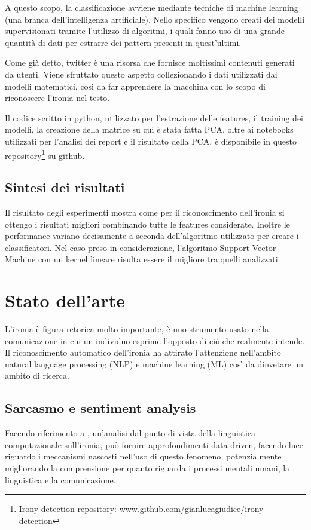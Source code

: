 \documentclass[oneside]{book}
\begin{document}
A questo scopo, la classificazione avviene mediante tecniche di machine learning (una branca dell'intelligenza artificiale). Nello specifico vengono creati dei modelli supervisionati tramite l'utilizzo di algoritmi, i quali fanno uso di una grande quantità di dati per estrarre dei pattern presenti in quest'ultimi.

Come già detto, twitter è una risorsa che fornisce moltissimi contenuti generati da utenti. Viene sfruttato questo aspetto collezionando i dati utilizzati dai modelli matematici, così da far apprendere la macchina con lo scopo di riconoscere l'ironia nel testo.

Il codice scritto in python, utilizzato per l'estrazione delle features, il training dei modelli, la creazione della matrice su cui è stata fatta PCA, oltre ai notebooks utilizzati per l'analisi dei report e il risultato della PCA, è disponibile in questo repository\footnote{Irony detection repository: \url{www.github.com/gianlucagiudice/irony-detection}} su github.

\section{Sintesi dei risultati}
Il risultato degli esperimenti mostra come per il riconoscimento dell'ironia si ottengo i risultati migliori combinando tutte le features considerate. Inoltre le performance variano decisamente a seconda dell'algoritmo utilizzato per creare i classificatori. Nel caso preso in considerazione, l'algoritmo Support Vector Machine con un kernel lineare risulta essere il migliore tra quelli analizzati.

\chapter{Stato dell'arte}
L'ironia è figura retorica molto importante, è uno strumento usato nella comunicazione in cui un individuo esprime l'opposto di ciò che realmente intende. Il riconoscimento automatico dell'ironia ha attirato l'attenzione nell'ambito natural language
processing (NLP) e machine learning (ML) così da dinvetare un ambito di ricerca. 

\section{Sarcasmo e sentiment analysis}
Facendo riferimento a \cite{survey4}, un'analisi dal punto di vista della linguistica computazionale sull'ironia, può fornire approfondimenti data-driven, facendo luce riguardo i meccanismi nascosti nell'uso di questo fenomeno, potenzialmente migliorando la comprensione per quanto riguarda i processi mentali umani, la linguistica e la comunicazione. 
\end{document}
